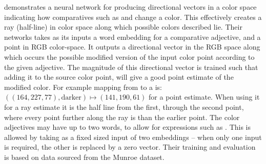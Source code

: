 \textcite{acl2018WinnLighter} demonstrates a neural network for producing directional vectors in a color space indicating how comparatives such as  and  change a color.
This effectively creates a ray (half-line) in color space along which possible colors described lie.
Their networks takes as its inputs a word embedding for a comparative adjective, and a point in RGB color-space.
It outputs a directional vector in the RGB space along which occurs the possible modified version of the input color point according to the given adjective.
The magnitude of this directional vector is trained such that adding it to the source color point, will give a good point estimate of the modified color.
For example mapping from  to a  is: $((164,227,77), \text{darker}) \mapsto (141, 190, 61)$ for a point estimate.
When using it for a ray estimate it is the half line from the first, through the second point, where every point further along the ray is  than the earlier point.
The color adjectives may have up to two words, to allow for expressions such as .
This is allowed by taking as a fixed sized input of two embeddings -- when only one input is required, the other is replaced by a zero vector.
Their training and evaluation is based on data sourced from the  Munroe dataset.




